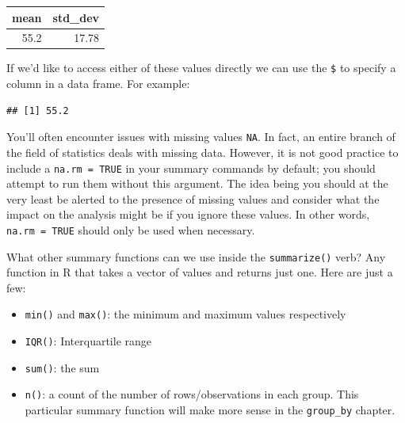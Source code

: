 \documentclass[]{tufte-book}
\newenvironment{Shaded}{\begin{snugshade}}{\end{snugshade}}
\newcommand{\KeywordTok}[1]{\textcolor[rgb]{0.13,0.29,0.53}{\textbf{{#1}}}}
\newcommand{\DataTypeTok}[1]{\textcolor[rgb]{0.13,0.29,0.53}{{#1}}}
\newcommand{\StringTok}[1]{\textcolor[rgb]{0.31,0.60,0.02}{{#1}}}
\newcommand{\OtherTok}[1]{\textcolor[rgb]{0.56,0.35,0.01}{{#1}}}
\newcommand{\NormalTok}[1]{{#1}}
\providecommand{\tightlist}{%
  \setlength{\itemsep}{0pt}\setlength{\parskip}{0pt}}
\theoremstyle{definition}
\theoremstyle{definition}
\theoremstyle{remark}
\begin{document}
\begin{Shaded}
\end{Shaded}

\begin{tabular}{r|r}
\hline
mean & std\_dev\\
\hline
55.2 & 17.78\\
\hline
\end{tabular}

If we'd like to access either of these values directly we can use the
\texttt{\$} to specify a column in a data frame. For example:

\begin{Shaded}
\end{Shaded}

\begin{verbatim}
## [1] 55.2
\end{verbatim}

You'll often encounter issues with missing values \texttt{NA}. In fact,
an entire branch of the field of statistics deals with missing data.
However, it is not good practice to include a \texttt{na.rm\ =\ TRUE} in
your summary commands by default; you should attempt to run them without
this argument. The idea being you should at the very least be alerted to
the presence of missing values and consider what the impact on the
analysis might be if you ignore these values. In other words,
\texttt{na.rm\ =\ TRUE} should only be used when necessary.

What other summary functions can we use inside the \texttt{summarize()}
verb? Any function in R that takes a vector of values and returns just
one. Here are just a few:

\begin{itemize}
\tightlist
\item
  \texttt{min()} and \texttt{max()}: the minimum and maximum values
  respectively
\item
  \texttt{IQR()}: Interquartile range
\item
  \texttt{sum()}: the sum
\item
  \texttt{n()}: a count of the number of rows/observations in each
  group. This particular summary function will make more sense in the
  \texttt{group\_by} chapter.
\end{itemize}
\end{document}
